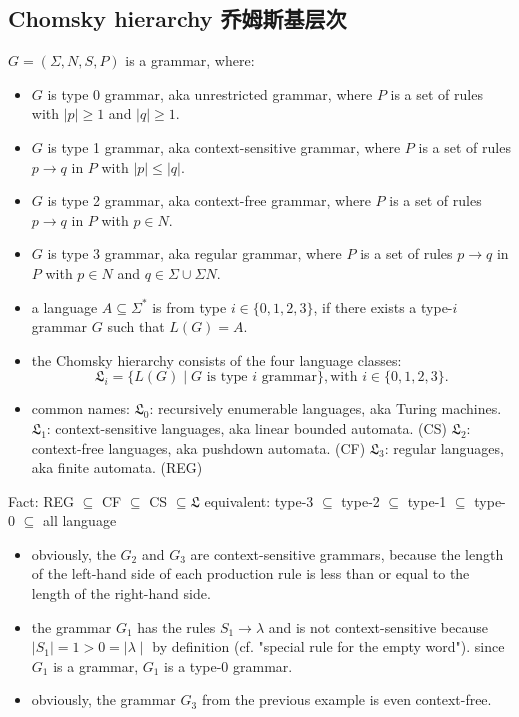 \documentclass[a4paper,11pt,utf8]{article}
\begin{document}
\subsection{Chomsky hierarchy 乔姆斯基层次}
\begin{tcolorbox}[title=Chomsky hierarchy,colback=white,colframe=black,width=\textwidth,arc=0pt]
    $G = (\Sigma,N,S,P)$ is a grammar, where:
    \begin{itemize}
        \item $G$ is type 0 grammar, aka unrestricted grammar, where $P$ is a set of rules with $|p| \geq 1$ and $|q| \geq 1$.
        \item $G$ is type 1 grammar, aka context-sensitive grammar, where $P$ is a set of rules $p \to q$ in $P$ with $|p| \leq |q|$.
        \item $G$ is type 2 grammar, aka context-free grammar, where $P$ is a set of rules $p \to q$ in $P$ with $p \in N$.
        \item $G$ is type 3 grammar, aka regular grammar, where $P$ is a set of rules $p \to q$ in $P$ with $p \in N$ and $q \in \Sigma \cup \Sigma N$.
        \item a language $A \subseteq \Sigma^*$ is from type $i \in \{0,1,2,3\}$, if there exists a type-$i$ grammar $G$ such that $L(G) = A$.
        \item the Chomsky hierarchy consists of the four language classes: \[
            \mathfrak{L}_i = \{L(G) \mid G \text{ is type } i \text{ grammar}\}, \text{with } i \in \{0,1,2,3\}.
        \]
        \item common names:
        \subitem $\mathfrak{L}_0$: recursively enumerable languages, aka Turing machines.
        \subitem $\mathfrak{L}_1$: context-sensitive languages, aka linear bounded automata. (CS)
        \subitem $\mathfrak{L}_2$: context-free languages, aka pushdown automata. (CF)
        \subitem $\mathfrak{L}_3$: regular languages, aka finite automata. (REG)
    \end{itemize}
\end{tcolorbox}
Fact: REG $\subseteq$ CF $\subseteq$ CS $\subseteq \mathfrak{L}$ \newindent
equivalent: type-3 $\subseteq$ type-2 $\subseteq$ type-1 $\subseteq$ type-0 $\subseteq$ all language
\begin{tcolorbox}[title=example,colback=white,colframe=black,width=\textwidth,arc=0pt]
    \begin{itemize}
        \item obviously, the $G_2$ and $G_3$ are context-sensitive grammars, because the length of the left-hand side of each production rule is less than or equal to the length of the right-hand side.
        \item the grammar $G_1$ has the rules $S_1 \to \lambda$ and is not context-sensitive because $\mid S_1 \mid = 1 > 0 = \mid \lambda \mid$ by definition (cf. "special rule for the empty word"). since $G_1$ is a grammar, $G_1$ is a type-0 grammar.
        \item obviously, the grammar $G_3$ from the previous example is even context-free.
    \end{itemize}
\end{tcolorbox}
\end{document}
